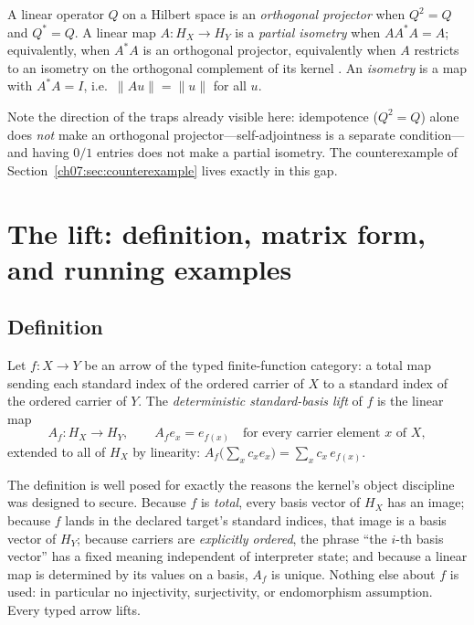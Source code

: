 \begin{definition}\label{ch07:def:projpi}
A linear operator $Q$ on a Hilbert space is an \emph{orthogonal projector}
when $Q^2=Q$ and $Q^*=Q$. A linear map $A:H_X\to H_Y$ is a \emph{partial
isometry} when $A A^* A=A$; equivalently, when $A^*A$ is an orthogonal
projector, equivalently when $A$ restricts to an isometry on the orthogonal
complement of its kernel \cite{horn}. An \emph{isometry} is a map with
$A^*A=I$, i.e.\ $\lVert Au\rVert=\lVert u\rVert$ for all $u$.
\end{definition}

Note the direction of the traps already visible here: idempotence ($Q^2=Q$)
alone does \emph{not} make an orthogonal projector---self-adjointness is a
separate condition---and having $0/1$ entries does not make a partial
isometry. The counterexample of Section~\ref{ch07:sec:counterexample} lives
exactly in this gap.

\section{The lift: definition, matrix form, and running examples}\label{ch07:sec:lift}

\subsection{Definition}

\begin{definition}\label{ch07:def:lift}
Let $f:X\to Y$ be an arrow of the typed finite-function category: a total map
sending each standard index of the ordered carrier of $X$ to a standard index
of the ordered carrier of $Y$. The \emph{deterministic standard-basis lift}
of $f$ is the linear map
\[
A_f:H_X\longrightarrow H_Y,\qquad A_f e_x = e_{f(x)}
\quad\text{for every carrier element } x \text{ of } X,
\]
extended to all of $H_X$ by linearity:
$A_f\bigl(\textstyle\sum_x c_x e_x\bigr)=\sum_x c_x\, e_{f(x)}$.
\end{definition}

The definition is well posed for exactly the reasons the kernel's object
discipline was designed to secure. Because $f$ is \emph{total}, every basis
vector of $H_X$ has an image; because $f$ lands in the declared target's
standard indices, that image is a basis vector of $H_Y$; because carriers are
\emph{explicitly ordered}, the phrase ``the $i$-th basis vector'' has a fixed
meaning independent of interpreter state; and because a linear map is
determined by its values on a basis, $A_f$ is unique. Nothing else about $f$
is used: in particular no injectivity, surjectivity, or endomorphism
assumption. Every typed arrow lifts.


